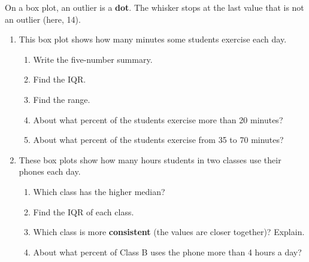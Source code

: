 \documentclass[11pt]{article}
\begin{document}
\begin{center}\end{center}

On a box plot, an outlier is a \textbf{dot}. The whisker stops at the last value that is not an outlier (here, 14).

\partner

\newpage
\begin{enumerate}

\item This box plot shows how many minutes some students exercise each day.
\begin{center}\end{center}
\begin{enumerate}[itemsep=1.6em]
  \item Write the five-number summary. 
  \item Find the IQR. 
  \item Find the range. 
  \item About what percent of the students exercise more than 20 minutes? 
  \item About what percent of the students exercise from 35 to 70 minutes? 
\end{enumerate}
\work{1.5em}

\item These box plots show how many hours students in two classes use their phones each day.
\begin{center}\end{center}
\begin{enumerate}[itemsep=1.6em]
  \item Which class has the higher median? 
  \item Find the IQR of each class. 
  \item Which class is more \textbf{consistent} (the values are closer together)? Explain.

  \work{2.5em}
  \item About what percent of Class B uses the phone more than 4 hours a day? 
\end{enumerate}


\end{enumerate}
\end{document}
